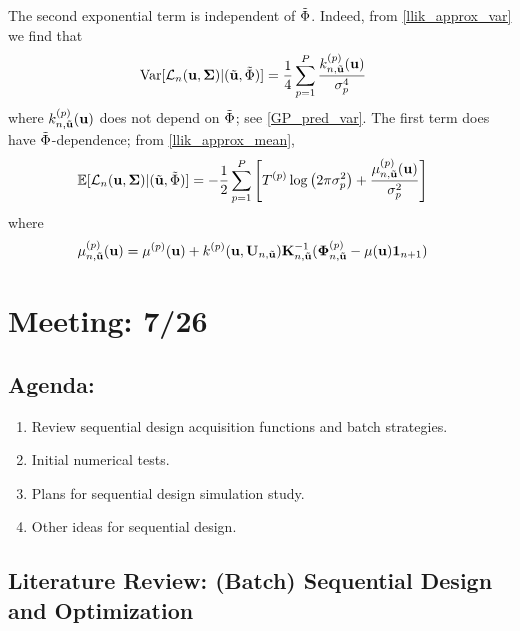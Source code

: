 \documentclass[12pt]{article}
\begin{document}
The second exponential term is independent of $\tilde{\SSR}$. Indeed, from \ref{llik_approx_var} we find that
\begin{align*}
\Var[\llik_{\designIdx}(\bpar, \CovObs) | (\tilde{\bpar}, \tilde{\SSR})] &= \frac{1}{4} \sum_{\objIdx = 1}^{\Nobj} \frac{\GPKerPredOut{\designIdx, \tilde{\bpar}}{\objIdx}(\bpar)}{\sdObs_{\objIdx}^4}
\end{align*}
where $\GPKerPredOut{\designIdx, \tilde{\bpar}}{\objIdx}(\bpar)$ does not depend on $\tilde{\SSR}$; see \ref{GP_pred_var}. The first term does have $\tilde{\SSR}$-dependence; from \ref{llik_approx_mean},
\begin{align*}
\E[\llik_{\designIdx}(\bpar, \CovObs) | (\tilde{\bpar}, \tilde{\SSR})] &= -\frac{1}{2} \sum_{\objIdx = 1}^{\Nobj} \left[\indexObj{\Ntime} \log\left(2\postDens \sdObs_{\objIdx}^2 \right) + \frac{\GPMeanPredOut{\designIdx, \tilde{\bpar}}{\objIdx}(\bpar)}{\sdObs_{\objIdx}^2} \right]
\end{align*}
where 
\begin{align*}
\indexDesignObj{\GPMean}{\designIdx,\tilde{\bpar}}(\bpar) &= \indexObj{\GPMean}(\bpar) + 
\indexObj{\GPKer}(\bpar, \designMat[\designIdx, \tilde{\bpar}]) \KerMat[\designIdx, \tilde{\bpar}]^{-1} (\indexDesignObj{\SSRObs}{\designIdx, \tilde{\bpar}} - \GPMean(\bpar)\oneVec{\designIdx+1})
\end{align*}

\section{Meeting: 7/26}

\subsection{Agenda:}
\begin{enumerate}
\item Review sequential design acquisition functions and batch strategies. 
\item Initial numerical tests. 
\item Plans for sequential design simulation study. 
\item Other ideas for sequential design. 
\end{enumerate}

\subsection{Literature Review: (Batch) Sequential Design and Optimization}
\end{document}

